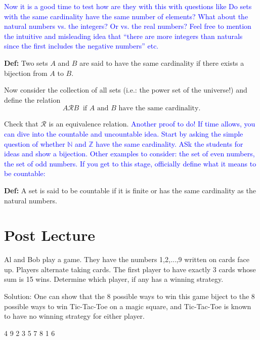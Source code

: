 \documentclass{article}
\begin{document}
\textcolor{blue}{Now it is a good time to test how are they with this with questions like Do sets with the same cardinality have the same number of elements? What about the natural numbers vs. the integers? Or vs. the real numbers? Feel free to mention the intuitive and misleading idea that ``there are more integers than naturals since the first includes the negative numbers'' etc.}

{\bf Def:} Two sets $A$ and $B$ are said to have the same cardinality if there exists a bijection from $A$ to $B$.

Now consider the collection of all sets (i.e.: the power set of the universe!) and define the relation
\[
A\mathcal{R} B~\mbox{ if $A$ and $B$ have the same cardinality.}
\]

Check that $\mathcal{R}$ is an equivalence relation. \textcolor{blue}{Another proof to do! If time allows, you can dive into the countable and uncountable idea. Start by asking the simple question of whether $\mathbb{N}$ and $\mathbb{Z}$ have the same cardinality. ASk the students for ideas and show a bijection. Other examples to consider: the set of even numbers, the set of odd numbers. If you get to this stage, officially define what it means to be countable:}

{\bf Def:} A set is said to be countable if it is finite or has the same cardinality as the natural numbers.


\section*{Post Lecture}

Al and Bob play a game. They have the numbers 1,2,...,9 written on cards face up. Players alternate taking cards. The first player to have exactly 3 cards whose sum is 15 wins. Determine which player, if any has a winning strategy.

Solution: One can show that the 8 possible ways to win this game biject to the 8 possible ways to win Tic-Tac-Toe on a magic square, and Tic-Tac-Toe is known to have no winning strategy for either player.


4 9 2
3 5 7
8 1 6
\end{document}
